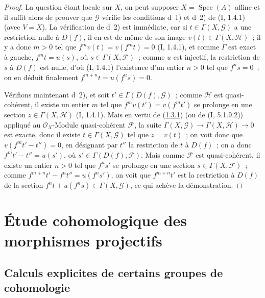 \begin{proof}
La question étant locale sur $X$, on peut supposer
$X=\operatorname{Spec}(A)$ affine et il suffit alors de prouver que
$\mathcal G$ vérifie les conditions d~1) et d~2) de (I, 1.4.1) (avec
$V=X$). La vérification de d~2) est immédiate, car si
$t\in\Gamma(X,\mathcal G)$ a une restriction nulle à $D(f)$, il en est de
même de son image $v(t)\in\Gamma(X,\mathcal H)$~; il y a donc $m>0$ tel que
$f^mv(t)=v(f^mt)=0$ (I, 1.4.1), et comme $\Gamma$ est exact à gauche,
$f^mt=u(s)$, où $s\in\Gamma(X,\mathcal F)$~; comme $u$ est injectif, la
restriction de $s$ à $D(f)$ est nulle, d'où (I, 1.4.1) l'existence d'un
entier $n>0$ tel que $f^ns=0$~; on en déduit finalement
$f^{m+n}t=u(f^ns)=0$.

Vérifions maintenant d~2), et soit $t'\in\Gamma(D(f),\mathcal G)$~; comme
$\mathcal H$ est quasi-cohérent, il existe un entier $m$ tel que
$f^mv(t')=v(f^mt')$ se prolonge en une section
$z\in\Gamma(X,\mathcal H)$ (I, 1.4.1). Mais en vertu de
(\hyperref[III.1.3.1-fr]{1.3.1}) (ou de (I, 5.1.9.2)) appliqué au
$\mathcal O_X$-Module quasi-cohérent $\mathcal F$, la suite
$\Gamma(X,\mathcal G)\to\Gamma(X,\mathcal H)\to0$ est exacte, donc il existe
$t\in\Gamma(X,\mathcal G)$ tel que $z=v(t)$~; on voit donc que
$v(f^mt'-t'')=0$, en désignant par $t''$ la restriction de $t$ à $D(f)$~;
on a donc $f^mt'-t''=u(s')$, où $s'\in\Gamma(D(f),\mathcal F)$. Mais comme
$\mathcal F$ est quasi-cohérent, il existe un entier $n>0$ tel que $f^ns'$
se prolonge en une section $s\in\Gamma(X,\mathcal F)$~; comme
$f^{m+n}t'-f^nt''=u(f^ns')$, on voit que $f^{m+n}t'$ est la restriction à
$D(f)$ de la section $f^nt+u(f^ns)\in\Gamma(X,\mathcal G)$, ce qui achève
la démonstration.
\end{proof}

\section{Étude cohomologique des morphismes projectifs}
\label{section:III.2-fr}

\subsection{Calculs explicites de certains groupes de cohomologie}
\label{subsection:III.2.1-fr}

